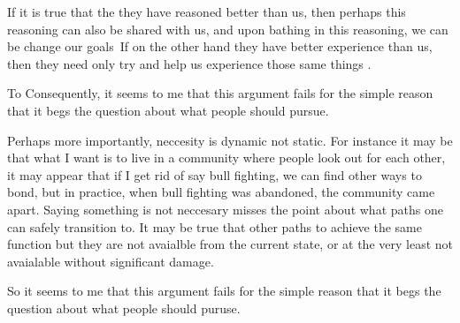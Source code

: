 If it is true that the they have reasoned better than us, then perhaps this reasoning can also be shared with us, and upon bathing in this reasoning, we can be change our goals\ If on the other hand they have better experience than us, then they need only try and help us experience those same things .

To 
Consequently, it seems to me that this argument fails for the simple reason that it begs the question about what people should pursue.

Perhaps more importantly, neccesity is dynamic not static. For instance it may be that what I want is to live in a community where people look out for each other, it may appear that if I get rid of say bull fighting, we can find other ways to bond, but in practice, when bull fighting was abandoned, the community came apart. Saying something is not neccesary misses the point about what paths one can safely transition to. It may be true that other paths to achieve the same function but they are not avaialble from the current state, or at the very least not avaialable without significant damage. 

So it seems to me that this argument fails for the simple reason that it begs the question about what people should puruse. 





